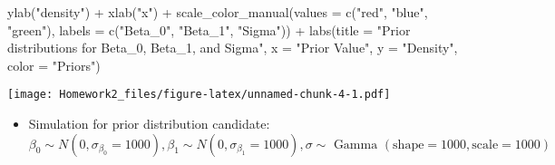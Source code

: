 \documentclass[
]{article}
\newenvironment{Shaded}{\begin{snugshade}}{\end{snugshade}}
\newcommand{\AttributeTok}[1]{\textcolor[rgb]{0.77,0.63,0.00}{#1}}
\newcommand{\FunctionTok}[1]{\textcolor[rgb]{0.00,0.00,0.00}{#1}}
\newcommand{\NormalTok}[1]{#1}
\newcommand{\SpecialCharTok}[1]{\textcolor[rgb]{0.00,0.00,0.00}{#1}}
\newcommand{\StringTok}[1]{\textcolor[rgb]{0.31,0.60,0.02}{#1}}
\providecommand{\tightlist}{%
  \setlength{\itemsep}{0pt}\setlength{\parskip}{0pt}}
\begin{document}
\begin{Shaded}
\begin{Highlighting}[]
  \FunctionTok{ylab}\NormalTok{(}\StringTok{"density"}\NormalTok{) }\SpecialCharTok{+} 
  \FunctionTok{xlab}\NormalTok{(}\StringTok{"x"}\NormalTok{) }\SpecialCharTok{+} 
  \FunctionTok{scale\_color\_manual}\NormalTok{(}\AttributeTok{values =} \FunctionTok{c}\NormalTok{(}\StringTok{"red"}\NormalTok{, }\StringTok{"blue"}\NormalTok{, }\StringTok{"green"}\NormalTok{), }
                     \AttributeTok{labels =} \FunctionTok{c}\NormalTok{(}\StringTok{"Beta\_0"}\NormalTok{, }\StringTok{"Beta\_1"}\NormalTok{, }\StringTok{"Sigma"}\NormalTok{)) }\SpecialCharTok{+}
  \FunctionTok{labs}\NormalTok{(}\AttributeTok{title =} \StringTok{"Prior distributions for Beta\_0, Beta\_1, and Sigma"}\NormalTok{,}
       \AttributeTok{x =} \StringTok{"Prior Value"}\NormalTok{,}
       \AttributeTok{y =} \StringTok{"Density"}\NormalTok{,}
       \AttributeTok{color =} \StringTok{"Priors"}\NormalTok{)}
\end{Highlighting}
\end{Shaded}

\texttt{[image: Homework2\_files/figure-latex/unnamed-chunk-4-1.pdf]}

\begin{itemize}
\tightlist
\item
  Simulation for prior distribution candidate: \[\begin{equation}
  \beta_0 \sim N\left(0, \sigma_{\beta_0}=1000\right), \beta_1 \sim N\left(0, \sigma_{\beta_1}=1000\right), \sigma \sim \text { Gamma }(\text {shape}=1000, \text {scale}=1000)
  \end{equation}\]
\end{itemize}
\end{document}

